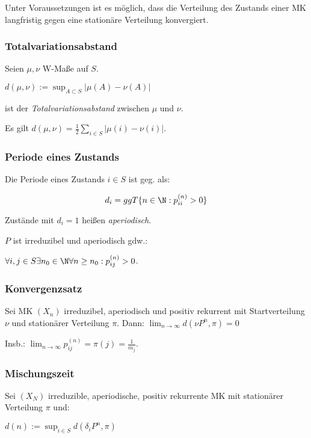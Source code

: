 Unter Voraussetzungen ist es möglich, dass die Verteilung des Zustands einer MK langfristig gegen eine stationäre Verteilung konvergiert.

\subsubsection*{Totalvariationsabstand}

Seien $\mu, \nu$ W-Maße auf $S$.

$d(\mu, \nu) := \sup_{A \subset S} |\mu(A)-\nu(A)|$

ist der \emph{Totalvariationsabstand} zwischen $\mu$ und $\nu$.

\vspace*{1mm}

Es gilt $d(\mu,\nu) = \frac{1}{2} \sum_{i \in S} |\mu(i) - \nu(i)|$.

\subsubsection*{Periode eines Zustands}

Die Periode eines Zustands $i \in S$ ist geg. als:

\vspace*{-2mm}
$$d_i = ggT\{ n \in \N : p_{ii}^{(n)} > 0 \}$$

Zustände mit $d_i = 1$ heißen \emph{aperiodisch}.

$P$ ist irreduzibel und aperiodisch gdw.:

$\forall i, j \in S \exists n_0 \in \N \forall n \geq n_0 : p_{ij}^{(n)} > 0$.

\subsubsection*{Konvergenzsatz}

Sei MK $(X_n)$ irreduzibel, aperiodisch und positiv rekurrent mit Startverteilung $\nu$ und stationärer Verteilung $\pi$. Dann: $\lim_{n \to \infty} d(\nu P^n, \pi) = 0$

Insb.: $\lim_{n\to\infty} p_{ij}^{(n)} = \pi(j) = \frac{1}{m_j}$.

\subsubsection*{Mischungszeit}

Sei $(X_N)$ irreduzible, aperiodische, positiv rekurrente MK mit stationärer Verteilung $\pi$ und:

$d(n) := \sup_{i \in S} d(\delta_i P^n,\pi)$

